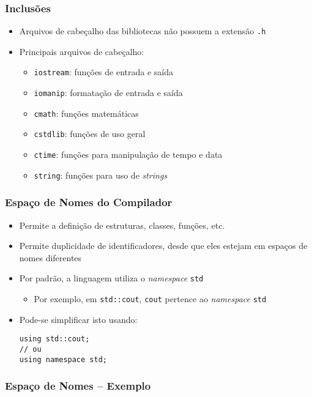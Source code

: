 \documentclass[aspectratio=169]{beamer}
\begin{document}
\begin{frame}\frametitle{Inclusões}
\begin{itemize}
	\item Arquivos de cabeçalho das bibliotecas não possuem a extensão \texttt{.h}
	\item Principais arquivos de cabeçalho:
	\begin{itemize}
		\item \texttt{iostream}: funções de entrada e saída
		\item \texttt{iomanip}: formatação de entrada e saída
		\item \texttt{cmath}: funções matemáticas
		\item \texttt{cstdlib}: funções de uso geral
		\item \texttt{ctime}: funções para manipulação de tempo e data
		\item \texttt{string}: funções para uso de \emph{strings}
	\end{itemize}
\end{itemize}
\end{frame}

\begin{frame}[fragile]\frametitle{Espaço de Nomes do Compilador}
\begin{itemize}
	\item Permite a definição de estruturas, classes, funções, etc.
	\item Permite duplicidade de identificadores, desde que eles estejam em espaços de nomes diferentes
	\item Por padrão, a linguagem utiliza o \emph{namespace} \texttt{std}
	\begin{itemize}
		\item Por exemplo, em \texttt{std::cout}, \texttt{cout} pertence ao \emph{namespace} \texttt{std}
	\end{itemize}
	\item Pode-se simplificar isto usando:
\begin{lstlisting}
using std::cout;
// ou
using namespace std;
\end{lstlisting}
\end{itemize}
\end{frame}

\begin{frame}[fragile]\frametitle{Espaço de Nomes -- Exemplo}

\end{frame}
\end{document}
